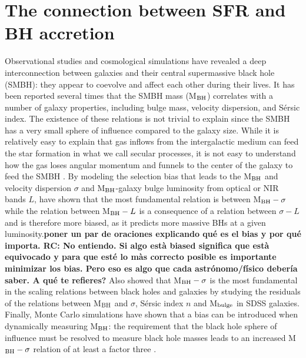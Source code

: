 \section{The connection between SFR and BH accretion}
Observational studies and cosmological simulations have revealed a deep interconnection between galaxies and their central supermassive black hole (SMBH): they appear to coevolve and affect each other during their lives.
It has been reported several times that the SMBH mass (M$_{\rm BH}$) correlates with a number of galaxy properties, including bulge mass, velocity dispersion, and S\'{e}rsic index. The existence of these relations is not trivial to explain since the SMBH has a very small sphere of influence compared to the galaxy size. While it is relatively easy to explain that gas inflows from the intergalactic medium can feed the star formation in what we call secular processes, it is not easy to understand how the gas loses angular momentum and funnels to the center of the galaxy to feed the SMBH \citep{2019NatAs...3...48S}. %
By modeling the selection bias that leads to the M$_{\rm BH}$ and velocity dispersion $\sigma$ and M$_{\rm BH}$-galaxy bulge luminosity from optical or NIR bands $L$, \citet{2007ApJ...660..267B} have shown that the most fundamental relation is between M$_{\rm BH}-\sigma$ while the relation between M$_{\rm BH}- L$ is a consequence of a relation between $\sigma-L$ and is therefore more biased, as it predicts more massive BHs at a given luminosity.{\bf poner un par de oraciones explicando qué es el bias y por qué importa. RC: No entiendo. Si algo està biased significa que està equivocado y para que esté lo màs correcto posible es importante minimizar los bias. Pero eso es algo que cada astrónomo/físico debería saber. A qué te refieres?} Also \citet{2017MNRAS.466.4029S} showed that M$_{\rm BH}-\sigma$ is the most fundamental in the scaling relations between black holes and galaxies by studying the residuals of the relations between M$_{\rm BH}$ and $\sigma$, S\'{e}rsic index $n$ and M$_{\rm bulge}$ in SDSS galaxies. Finally, Monte Carlo simulations have shown that a bias can be introduced when dynamically measuring M$_{\rm BH}$: the requirement that the black hole sphere of influence must be resolved to measure black hole masses leads to an increased M$_{\rm BH}-\sigma$ relation of at least a factor three \citep{2016MNRAS.460.3119S}.
